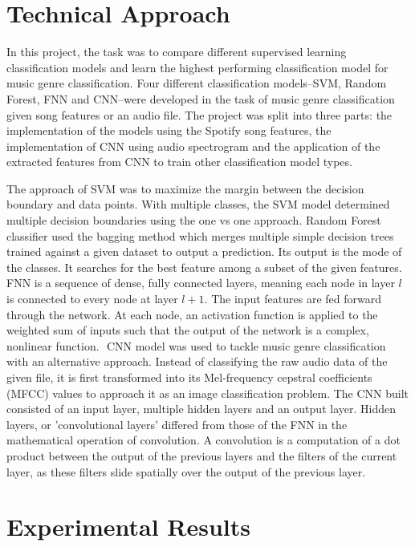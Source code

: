 \documentclass[11.5pt]{article}
\begin{document}
\section{Technical Approach}
In this project, the task was to compare different supervised learning classification models and learn the highest performing classification model for music genre classification.  Four different classification models–SVM, Random Forest, FNN and CNN–were developed in the task of music genre classification given song features or an audio file. The project was split into three parts: the implementation of the models using the Spotify song features, the implementation of CNN using audio spectrogram and the application of the extracted features from CNN to train other classification model types.
 
The approach of SVM was to maximize the margin between the decision boundary and data points. With multiple classes, the SVM model determined multiple decision boundaries using the one vs one approach. Random Forest classifier used the bagging method which merges multiple simple decision trees trained against a given dataset to output a prediction. Its output is the mode of the classes. It searches for the best feature among a subset of the given features. FNN is a sequence of dense, fully connected layers, meaning each node in layer $l$ is connected to every node at layer $l + 1$. The input features are fed forward through the network. At each node, an activation function is applied to the weighted sum of inputs such that the output of the network is a complex, nonlinear function. 
​
CNN model was used to tackle music genre classification with an alternative approach. Instead of classifying the raw audio data of the given file, it is first transformed into its Mel-frequency cepstral coefficients (MFCC) values to approach it as an image classification problem. The CNN built consisted of an input layer, multiple hidden layers and an output layer. Hidden layers, or 'convolutional layers' differed from those of the FNN  in the mathematical operation of convolution. A convolution is a computation of a dot product between the output of the previous layers and the filters of the current layer, as these filters slide spatially over the output of the previous layer. 
​
\section{Experimental Results}
​
\end{document}
